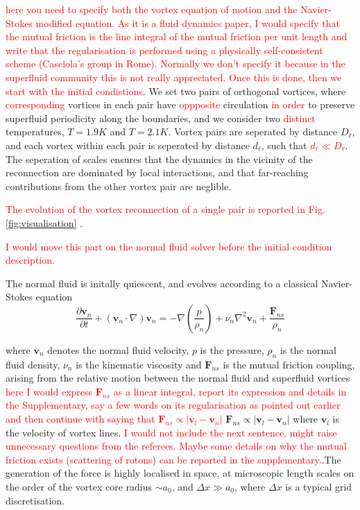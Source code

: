 \documentclass[%
 reprint,
 amsmath,amssymb,
 aps,
 prl,
]{revtex4-2}
\def \v{\mathbf{v}}
\def\red#1{\textcolor{red}{#1}}
\begin{document}
\red{here you need to specify both the vortex equation of motion and the Navier-Stokes modified equation. As it is a fluid dynamics paper, I would specify that the mutual friction is the line integral of the mutual friction per unit length and write that the regularisation is performed using a physically self-consistent scheme (Casciola's group in Rome). Normally we don't specify it because in the superfluid community this is not really appreciated. Once this is done, then we start with the initial condistions}. We set two pairs of orthogonal vortices, where \red{corresponding} vortices in each pair have \red{oppposite} circulation \red{in order} to preserve superfluid periodicity along the boundaries, and we consider two \red{distinct} temperatures, $T=1.9K$ and $T=2.1K$. Vortex pairs are seperated by distance $D_{\ell}$, and each vortex within each pair is seperated by distance $d_{\ell}$, such that \red{$d_{\ell}\ll D_{\ell}$}. The seperation of scales ensures that the dynamics in the vicinity of the reconnection are dominated by local interactions, and that far-reaching contributions from the other vortex pair are neglible. 

\red{The evolution of the vortex reconnection of a single pair is reported in Fig. \ref{fig:visualisation} }. 

\red{I would move this part on the normal fluid solver before the initial condition description.}

The normal fluid is initally quiescent, and evolves according to a classical Navier-Stokes equation
\begin{equation}
    \frac{\partial\v_n}{\partial t } + (\v_n\cdot\nabla)\v_n = -\nabla\left(\frac{p}{\rho_n}\right) + \nu_n\nabla^2\v_n + \frac{\mathbf{F}_{ns}}{\rho_n}
\end{equation}
 
where $\v_n$ denotes the normal fluid velocity, $p$ is the pressure, $\rho_n$ is the normal fluid density, $\nu_n$ is the kinematic viscosity and $\mathbf{F}_{ns}$ is the mutual friction coupling, arising from the relative motion between the normal fluid and superfluid vortices 
\red{here I would express $\mathbf{F}_{ns}$ as a linear integral, report its expression and details in the Supplementary, say a few words on its regularisation as pointed out earlier and then continue with saying that $\mathbf{F}_{ns}\propto \left|\v_{l}-\v_n\right|$ }
$\mathbf{F}_{ns}\propto \left|\v_{l}-\v_n\right|$ where $\v_l$ is the velocity of vortex lines. 
\red{I would not include the next sentence, might raise unnecessary questions from the referees. Maybe some details on why the mutual friction exists (scattering of rotons) can be reported in the supplementary.}.The generation of the force is highly localised in space, at microscopic length scales on the order of the vortex core radius $\sim a_0$, and $\Delta x \gg a_0$, where $\Delta x$ is a typical grid discretisation. 
\end{document}

